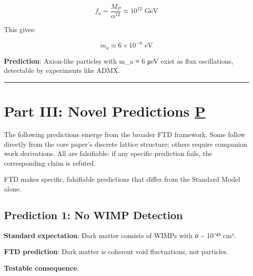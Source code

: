 \documentclass[
  11pt,
  letterpaper,
  twoside,
  openany]{book}
\makeatletter
\let\orig@section\section
\renewcommand{\section}{\needspace{8\baselineskip}\orig@section}
\let\orig@subsection\subsection
\renewcommand{\subsection}{\needspace{6\baselineskip}\orig@subsection}
\makeatother
\begin{document}
\[f_a = \frac{M_P}{\alpha^{12}} \approx 10^{12} \text{ GeV}\]

This gives:

\[m_a \approx 6 \times 10^{-6} \text{ eV}\]

\textbf{Prediction}: Axion-like particles with m\_a ≈ 6 μeV exist as
flux oscillations, detectable by experiments like ADMX.

\begin{center}\rule{0.5\linewidth}{0.5pt}\end{center}

\section{\texorpdfstring{Part III: Novel Predictions
\hyperref[p]{P}}{Part III: Novel Predictions P}}\label{part-iii-novel-predictions-p}

\begin{tcolorbox}[enhanced jigsaw, colbacktitle=quarto-callout-note-color!10!white, titlerule=0mm, bottomtitle=1mm, bottomrule=.15mm, colback=white, arc=.35mm, breakable, toprule=.15mm, title=\textcolor{quarto-callout-note-color}{\faInfo}\hspace{0.5em}{Predictions (Falsifiable)}, rightrule=.15mm, coltitle=black, leftrule=.75mm, colframe=quarto-callout-note-color-frame, toptitle=1mm, opacityback=0, opacitybacktitle=0.6, left=2mm]

The following predictions emerge from the broader FTD framework. Some
follow directly from the core paper's discrete lattice structure; others
require companion work derivations. All are falsifiable: if any specific
prediction fails, the corresponding claim is refuted.

\end{tcolorbox}

FTD makes specific, falsifiable predictions that differ from the
Standard Model alone.

\subsection{Prediction 1: No WIMP
Detection}\label{prediction-1-no-wimp-detection}

\textbf{Standard expectation}: Dark matter consists of WIMPs with σ
\textasciitilde{} 10⁻⁴⁵ cm².

\textbf{FTD prediction}: Dark matter is coherent void fluctuations, not
particles.

\textbf{Testable consequence}:
\end{document}
